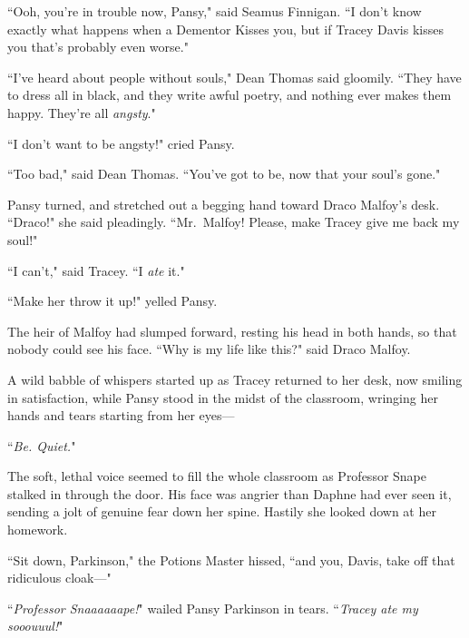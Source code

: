 ``Ooh, you're in trouble now, Pansy," said Seamus Finnigan. ``I don't know exactly what happens when a Dementor Kisses you, but if Tracey Davis kisses you that's probably even worse."

``I've heard about people without souls," Dean Thomas said gloomily. ``They have to dress all in black, and they write awful poetry, and nothing ever makes them happy. They're all \emph{angsty}."

``I don't want to be angsty!" cried Pansy.

``Too bad," said Dean Thomas. ``You've got to be, now that your soul's gone."

Pansy turned, and stretched out a begging hand toward Draco Malfoy's desk. ``Draco!" she said pleadingly. ``Mr.~Malfoy! Please, make Tracey give me back my soul!"

``I can't," said Tracey. ``I \emph{ate} it."

``Make her throw it up!" yelled Pansy.

The heir of Malfoy had slumped forward, resting his head in both hands, so that nobody could see his face. ``Why is my life like this?" said Draco Malfoy.

A wild babble of whispers started up as Tracey returned to her desk, now smiling in satisfaction, while Pansy stood in the midst of the classroom, wringing her hands and tears starting from her eyes—

``\emph{Be. Quiet.}"

The soft, lethal voice seemed to fill the whole classroom as Professor Snape stalked in through the door. His face was angrier than Daphne had ever seen it, sending a jolt of genuine fear down her spine. Hastily she looked down at her homework.

``Sit down, Parkinson," the Potions Master hissed, ``and you, Davis, take off that ridiculous cloak—"

``\emph{Professor Snaaaaaape!}" wailed Pansy Parkinson in tears. ``\emph{Tracey ate my sooouuul!}"

